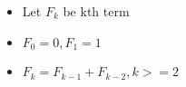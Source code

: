 \documentclass[preview]{standalone}
\begin{document}
\begin{center}
\begin{itemize} \item Let $F_k$ be kth term \\ \item $F_0 = 0, F_1 = 1$ \\ \item $F_k = F_{k -1} + F_{k - 2}, k >= 2$ \end{itemize}
\end{center}
\end{document}
